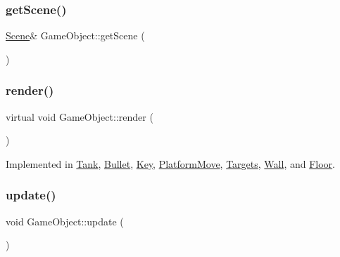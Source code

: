\subsubsection{\texorpdfstring{get\+Scene()}{getScene()}}
{\footnotesize\ttfamily \mbox{\hyperlink{class_scene}{Scene}}\& Game\+Object\+::get\+Scene (\begin{DoxyParamCaption}{ }\end{DoxyParamCaption})\hspace{0.3cm}{\ttfamily [inline]}}

\mbox{\label{class_game_object_adee58d508cfa907162d1192a25dc21b9}} 
\subsubsection{\texorpdfstring{render()}{render()}}
{\footnotesize\ttfamily virtual void Game\+Object\+::render (\begin{DoxyParamCaption}{ }\end{DoxyParamCaption})\hspace{0.3cm}{\ttfamily [pure virtual]}}



Implemented in \mbox{\hyperlink{class_tank_a9628f999ddc963311cebf069da363d5c}{Tank}}, \mbox{\hyperlink{class_bullet_a4b58c9ddf90ecd78b2e5b292c7496850}{Bullet}}, \mbox{\hyperlink{class_key_ad7047dce6eba1702bf776cb6ffeab3a6}{Key}}, \mbox{\hyperlink{class_platform_move_ac8e703c3529c602c9f0cc0a4148bcc34}{Platform\+Move}}, \mbox{\hyperlink{class_targets_ae4f6dccb119a885728dc9e9c3e287c95}{Targets}}, \mbox{\hyperlink{class_wall_ad2b19eb994789ac7588b61a7ad0d928f}{Wall}}, and \mbox{\hyperlink{class_floor_a243d39104b6aacb662481be4fda2d72e}{Floor}}.

\mbox{\label{class_game_object_adad7d284b670db722a2fda8e6a7997e3}} 
\subsubsection{\texorpdfstring{update()}{update()}}
{\footnotesize\ttfamily void Game\+Object\+::update (\begin{DoxyParamCaption}{ }\end{DoxyParamCaption})}



